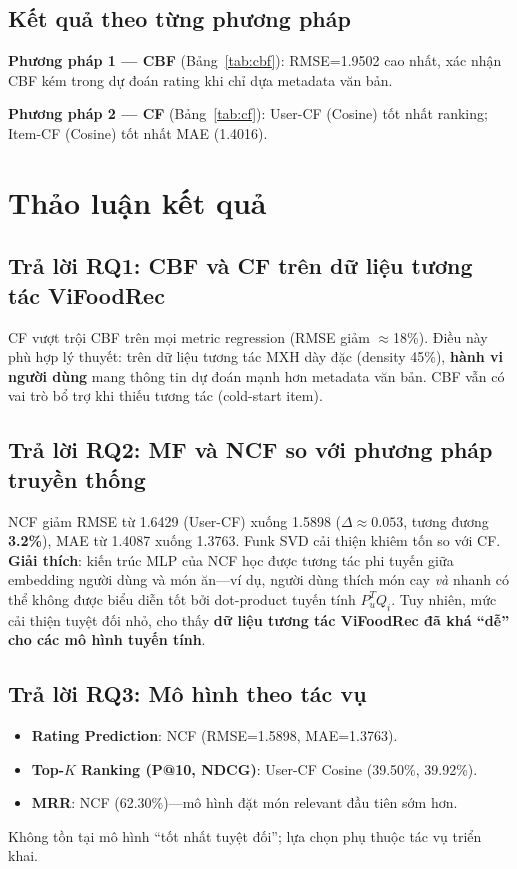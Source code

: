\documentclass[11pt]{article}
\begin{document}
\subsection{Kết quả theo từng phương pháp}

\textbf{Phương pháp 1 --- CBF} (Bảng~\ref{tab:cbf}): RMSE=1.9502 cao nhất, xác nhận CBF kém trong dự đoán rating khi chỉ dựa metadata văn bản.


\textbf{Phương pháp 2 --- CF} (Bảng~\ref{tab:cf}): User-CF (Cosine) tốt nhất ranking; Item-CF (Cosine) tốt nhất MAE (1.4016).



\section{Thảo luận kết quả}
\label{sec:discussion}

\subsection{Trả lời RQ1: CBF và CF trên dữ liệu tương tác ViFoodRec}
CF vượt trội CBF trên mọi metric regression (RMSE giảm $\approx$18\%). Điều này phù hợp lý thuyết: trên dữ liệu tương tác MXH dày đặc (density 45\%), \textbf{hành vi người dùng} mang thông tin dự đoán mạnh hơn metadata văn bản. CBF vẫn có vai trò bổ trợ khi thiếu tương tác (cold-start item).

\subsection{Trả lời RQ2: MF và NCF so với phương pháp truyền thống}
NCF giảm RMSE từ 1.6429 (User-CF) xuống 1.5898 ($\Delta \approx 0.053$, tương đương \textbf{3.2\%}), MAE từ 1.4087 xuống 1.3763. Funk SVD cải thiện khiêm tốn so với CF. \textbf{Giải thích}: kiến trúc MLP của NCF học được tương tác phi tuyến giữa embedding người dùng và món ăn---ví dụ, người dùng thích món cay \textit{và} nhanh có thể không được biểu diễn tốt bởi dot-product tuyến tính $P_u^T Q_i$. Tuy nhiên, mức cải thiện tuyệt đối nhỏ, cho thấy \textbf{dữ liệu tương tác ViFoodRec đã khá ``dễ'' cho các mô hình tuyến tính}.

\subsection{Trả lời RQ3: Mô hình theo tác vụ}
\begin{itemize}
    \item \textbf{Rating Prediction}: NCF (RMSE=1.5898, MAE=1.3763).
    \item \textbf{Top-$K$ Ranking (P@10, NDCG)}: User-CF Cosine (39.50\%, 39.92\%).
    \item \textbf{MRR}: NCF (62.30\%)---mô hình đặt món relevant đầu tiên sớm hơn.
\end{itemize}
Không tồn tại mô hình ``tốt nhất tuyệt đối''; lựa chọn phụ thuộc tác vụ triển khai.
\end{document}
